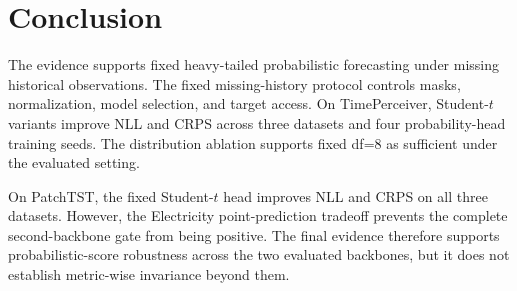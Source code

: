\section{Conclusion}
\label{sec:conclusion}

The evidence supports fixed heavy-tailed probabilistic forecasting under missing historical observations. The fixed missing-history protocol controls masks, normalization, model selection, and target access. On TimePerceiver, Student-$t$ variants improve NLL and CRPS across three datasets and four probability-head training seeds. The distribution ablation supports fixed df=8 as sufficient under the evaluated setting.

On PatchTST, the fixed Student-$t$ head improves NLL and CRPS on all three datasets. However, the Electricity point-prediction tradeoff prevents the complete second-backbone gate from being positive. The final evidence therefore supports probabilistic-score robustness across the two evaluated backbones, but it does not establish metric-wise invariance beyond them.
